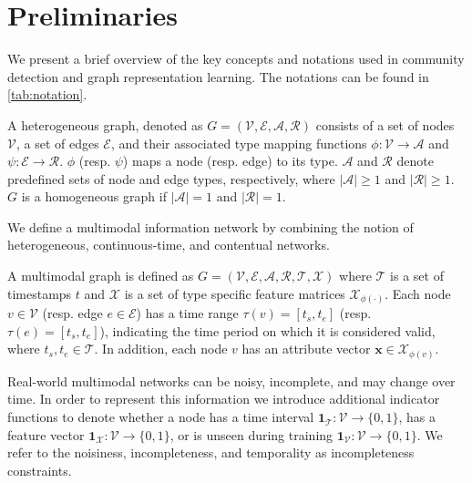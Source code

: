 \chapter{Preliminaries} \label{sec:preliminaries}



We present a brief overview of the key concepts and notations used in community detection and graph representation learning. The notations can be found in \cref{tab:notation}. 

\begin{secDefinition}
A heterogeneous graph, denoted as $G = (\mathcal{V}, \mathcal{E}, \mathcal{A}, \mathcal{R})$ consists of a set of nodes $\mathcal{V}$, a set of edges $\mathcal{E}$, and their associated type mapping functions $\phi : \mathcal{V} \rightarrow \mathcal{A}$ and $\psi : \mathcal{E} \rightarrow \mathcal{R}$. $\phi$ (resp. $\psi$) maps a node (resp. edge) to its type. $\mathcal{A}$ and $\mathcal{R}$ denote predefined sets of node and edge types, respectively, where $|\mathcal{A}| \geq 1$ and $|\mathcal{R}| \geq 1$. $G$ is a homogeneous graph if $|\mathcal{A}| = 1$ and $|\mathcal{R}| = 1$.
\end{secDefinition}

\noindent We define a multimodal information network by combining the notion of heterogeneous, continuous-time, and contentual networks. 
\begin{secDefinition}
A multimodal graph is defined as $G = (\mathcal{V}, \mathcal{E}, \mathcal{A}, \mathcal{R}, \mathcal{T}, \mathcal{X})$ where $\mathcal{T}$ is a set of timestamps $t$ and $\mathcal{X}$ is a set of type specific feature matrices $\mathcal{X}_{\phi(\cdot)}$.
Each node $v \in \mathcal{V}$ (resp. edge $e \in \mathcal{E}$) has a time range $\tau(v) = [t_s, t_e]$  (resp. $\tau(e) = [t_s, t_e]$), indicating the time period on which it is considered valid, where $t_s, t_e \in \mathcal{T}$. 
In addition, each node $v$ has an attribute vector $\mathbf{x} \in \mathcal{X}_{\phi(v)}$.
\end{secDefinition}

\begin{secDefinition} \label{def:incompleteness_constraints}
Real-world multimodal networks can be noisy, incomplete, and may change over time. 
In order to represent this information we introduce additional indicator functions to denote whether a node has a time interval $\mathbf{1}_{\mathcal{T}} : \mathcal{V} \rightarrow \{0, 1\}$, has a feature vector $\mathbf{1}_{\mathcal{X}} : \mathcal{V} \rightarrow \{0, 1\}$, or is unseen during training $\mathbf{1}_{\mathcal{V}} : \mathcal{V} \rightarrow \{0, 1\}$. 
We refer to the noisiness, incompleteness, and temporality as incompleteness constraints. 
\end{secDefinition}

